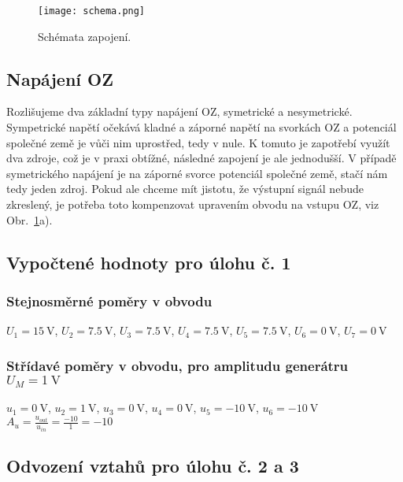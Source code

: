 \begin{figure}[h!]
    \centering
    \texttt{[image: schema.png]}
    \centering
    \caption{Schémata zapojení.}
    \label{fig:schema}
\end{figure}



\subsection{Napájení OZ}

    Rozlišujeme dva základní typy napájení OZ, symetrické a nesymetrické. Sympetrické napětí očekává kladné a záporné napětí na svorkách OZ a potenciál společné země je vůči nim uprostřed, tedy v nule. K tomuto je zapotřebí využít dva zdroje, což je v praxi obtížné, následné zapojení je ale jednodušší. V případě symetrického napájení je na záporné svorce potenciál společné země, stačí nám tedy jeden zdroj. Pokud ale chceme mít jistotu, že výstupní signál nebude zkreslený, je potřeba toto kompenzovat upravením obvodu na vstupu OZ, viz Obr.~\ref{fig:schema}a).


\subsection{Vypočtené hodnoty pro úlohu č. 1}
    \subsubsection{Stejnosměrné poměry v obvodu}
        $ U_1=\qty{15}{\volt} $, $ U_2=\qty{7.5}{\volt} $, $ U_3=\qty{7.5}{\volt} $, $ U_4=\qty{7.5}{\volt} $, $ U_5=\qty{7.5}{\volt} $, $ U_6=\qty{0}{\volt} $, $ U_7=\qty{0}{\volt} $


    \subsubsection{Střídavé poměry v obvodu, pro amplitudu generátru $ U_M=\qty{1}{\volt} $ }
        $ u_1=\qty{0}{\volt} $, 
        $ u_2=\qty{1}{\volt} $, 
        $ u_3=\qty{0}{\volt} $, 
        $ u_4=\qty{0}{\volt} $, 
        $ u_5=\qty{-10}{\volt} $, 
        $ u_6=\qty{-10}{\volt} $\\
        $ A_u=\frac{u_{out}}{u_{in}}=\frac{-10}{1}=-10 $

\subsection{Odvození vztahů pro úlohu č. 2 a 3}
